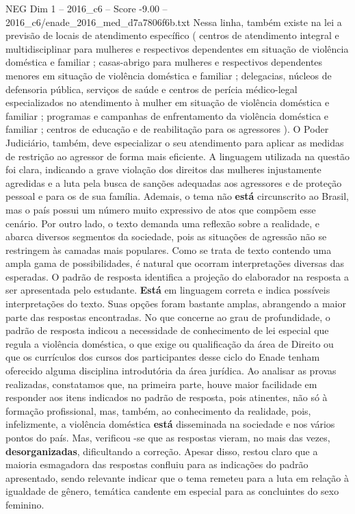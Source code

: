 \begin{textsample}{NEG Dim 1 – 2016\_c6 – Score -9.00 – 2016\_c6/enade\_2016\_med\_d7a7806f6b.txt}
Nessa linha, também existe na lei a previsão de locais de atendimento específico ( centros de atendimento integral e multidisciplinar para mulheres e respectivos dependentes em situação de violência doméstica e familiar ; casas-abrigo para mulheres e respectivos dependentes menores em situação de violência doméstica e familiar ; delegacias, núcleos de defensoria pública, serviços de saúde e centros de perícia médico-legal especializados no atendimento à mulher em situação de violência doméstica e familiar ; programas e campanhas de enfrentamento da violência doméstica e familiar ; centros de educação e de reabilitação para os agressores ).
O Poder Judiciário, também, deve especializar o seu atendimento para aplicar as medidas de restrição ao agressor de forma mais eficiente.
A linguagem utilizada na questão foi clara, indicando a grave violação dos direitos das mulheres injustamente agredidas e a luta pela busca de sanções adequadas aos agressores e de proteção pessoal e para os de sua família.
Ademais, o tema não \textbf{está} circunscrito ao Brasil, mas o país possui um número muito expressivo de atos que compõem esse cenário.
Por outro lado, o texto demanda uma reflexão sobre a realidade, e abarca diversos segmentos da sociedade, pois as situações de agressão não se restringem às camadas mais populares.
Como se trata de texto contendo uma ampla gama de possibilidades, é natural que ocorram interpretações diversas das esperadas.
O padrão de resposta identifica a projeção do elaborador na resposta a ser apresentada pelo estudante. \textbf{Está} em linguagem correta e indica possíveis interpretações do texto.
Suas opções foram bastante amplas, abrangendo a maior parte das respostas encontradas.
No que concerne ao grau de profundidade, o padrão de resposta indicou a necessidade de conhecimento de lei especial que regula a violência doméstica, o que exige ou qualificação da área de Direito ou que os currículos dos cursos dos participantes desse ciclo do Enade tenham oferecido alguma disciplina introdutória da área jurídica.
Ao analisar as provas realizadas, constatamos que, na primeira parte, houve maior facilidade em responder aos itens indicados no padrão de resposta, pois atinentes, não só à formação profissional, mas, também, ao conhecimento da realidade, pois, infelizmente, a violência doméstica \textbf{está} disseminada na sociedade e nos vários pontos do país.
Mas, verificou -se que as respostas vieram, no mais das vezes, \textbf{desorganizadas}, dificultando a correção.
Apesar disso, restou claro que a maioria esmagadora das respostas confluiu para as indicações do padrão apresentado, sendo relevante indicar que o tema remeteu para a luta em relação à igualdade de gênero, temática candente em especial para as concluintes do sexo feminino.

\end{textsample}
